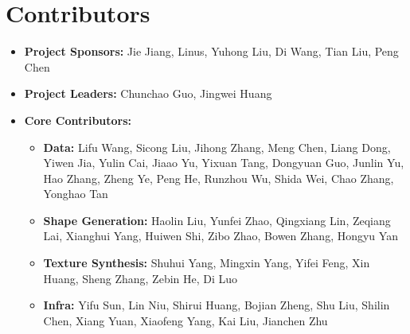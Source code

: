 \section{Contributors}
\begin{itemize}[leftmargin=0.25cm]
  \item \textbf{Project Sponsors:} Jie Jiang, Linus, Yuhong Liu, Di Wang, Tian Liu, Peng Chen
    \item \textbf{Project Leaders:} Chunchao Guo, Jingwei Huang
    \item \textbf{Core Contributors:}
    \begin{itemize}[leftmargin=0.5cm]
        \item \textbf{Data:} Lifu Wang, Sicong Liu, Jihong Zhang, Meng Chen, Liang Dong, Yiwen Jia, Yulin Cai, Jiaao Yu, Yixuan Tang, Dongyuan Guo, Junlin Yu, Hao Zhang, Zheng Ye, Peng He, Runzhou Wu, Shida Wei, Chao Zhang, Yonghao Tan
        \item \textbf{Shape Generation:} Haolin Liu, Yunfei Zhao, Qingxiang Lin, Zeqiang Lai, Xianghui Yang, Huiwen Shi, Zibo Zhao, Bowen Zhang, Hongyu Yan
        \item \textbf{Texture Synthesis:} Shuhui Yang, Mingxin Yang, Yifei Feng, Xin Huang, Sheng Zhang, Zebin He, Di Luo
        \item \textbf{Infra: } Yifu Sun, Lin Niu, Shirui Huang, Bojian Zheng, Shu Liu, Shilin Chen, Xiang Yuan, Xiaofeng Yang, Kai Liu, Jianchen Zhu
    \end{itemize}
\end{itemize}